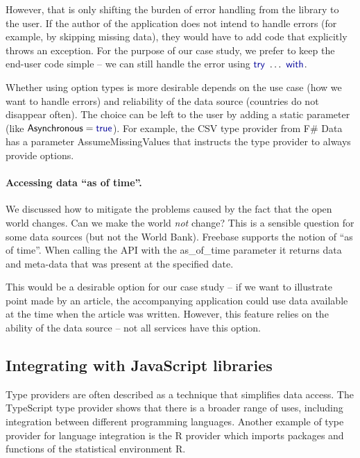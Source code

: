 \documentclass[submission,copyright,creativecommons]{eptcs}
\newcommand{\kvd}[1]{\textnormal{\textcolor{kvdclr}{\sffamily #1}}}
\newcommand{\ident}[1]{\textnormal{\sffamily #1}}
\begin{document}
However, that is only shifting the burden of error handling from the library to the user. If the
author of the application does not intend to handle errors (for example, by skipping missing data),
they would have to add code that explicitly throws an exception. For the purpose of our case study,
we prefer to keep the end-user code simple -- we can still handle the error using
$\kvd{try}~\ldots~\kvd{with}$.

Whether using option types is more desirable depends on the use case (how we want to handle errors)
and reliability of the data source (countries do not disappear often). The choice can be left to
the user by adding a static parameter (like $\ident{Asynchronous}=\kvd{true}$). For example, the CSV
type provider from F\# Data has a parameter \ident{AssumeMissingValues} that instructs the type
provider to always provide options.

\vspace{-1em}
\paragraph{Accessing data ``as of time''.}
We discussed how to mitigate the problems caused by the fact that the open world changes.
Can we make the world \emph{not} change? This is a sensible question for some data sources
(but not the World Bank). Freebase \cite{google-freebase} supports the notion of ``as of time''.
When calling the API with the \ident{as\_of\_time} parameter it returns data and meta-data that
was present at the specified date.

This would be a desirable option for our case study -- if we want to illustrate point made
by an article, the accompanying application could use data available at the time when the
article was written. However, this feature relies on the ability of the data source -- not all
services have this option.


\subsection{Integrating with JavaScript libraries}
\label{sec:tp-lang}

Type providers are often described as a technique that simplifies data access. The TypeScript
type provider shows that there is a broader range of uses, including integration between different
programming languages. Another example of type provider for language integration is the R
provider \cite{fsharp-rprovider} which imports packages and functions of the statistical
environment R.
\end{document}

